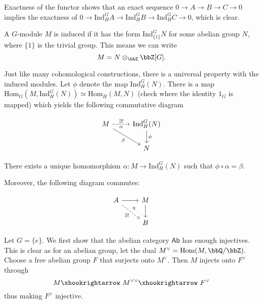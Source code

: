 \documentclass[a4paper, 12pt,oneside,openany]{book}
\begin{document}
Exactness of the functor shows that an exact sequence $0 \to A \to B \to C \to 0$ implies the exactness of $0 \to \text{Ind}_H^G A \to \text{Ind}_H^GB \to \text{Ind}_H^GC \to 0$, which is clear. 

A $G$-module $M$ is induced if it has the form $\text{Ind}_{\{1\}}^G N$ for some abelian group $N$, where $\{1\}$ is the trivial group. This means we can write $$M = N\otimes_\bbZ \bbZ[G].$$ 

Just like many cohomological constructions, there is a universal property with the induced modules. Let $\phi$ denote the map $\text{Ind}_H^G(N)$. There is a map $\text{Hom}_G(M, \text{Ind}_H^G(N)) \simeq \text{Hom}_H(M, N)$ (check where the identity $1_G$ is mapped) which yields the following commutative diagram

\[
\begin{tikzcd}
    M \arrow[r, dashed, "\exists !", "\alpha"'] \arrow[dr, swap, "\beta"] & \text{Ind}_H^G(N) \arrow{d}{\phi} \\
     & N
\end{tikzcd}
\]

There exists a unique homomorphism $\alpha: M\to \text{Ind}_H^G(N)$ such that $\phi \circ \alpha = \beta$. 


Moreover, the following diagram commutes:

\[
\begin{tikzcd}
    A \arrow[r] \arrow[dr, dashed, "\eta", "\exists!"'] & M \arrow{d} \\
     & B
\end{tikzcd}
\]


 Let $G = \{e\}$. We first show that the abelian category $\textsf{Ab}$ has enough injectives. This is clear as for an abelian group, let the dual $M^\vee = \text{Hom}(M, \bbQ/\bbZ).$ Choose a free abelian group $F$ that surjects onto $M^\vee$. Then $M$ injects onto $F^\vee$ through $$M \xhookrightarrow\ M^{\vee\vee} \xhookrightarrow\ F^{\vee}$$ thus making $F^\vee$ injective.
\end{document}
